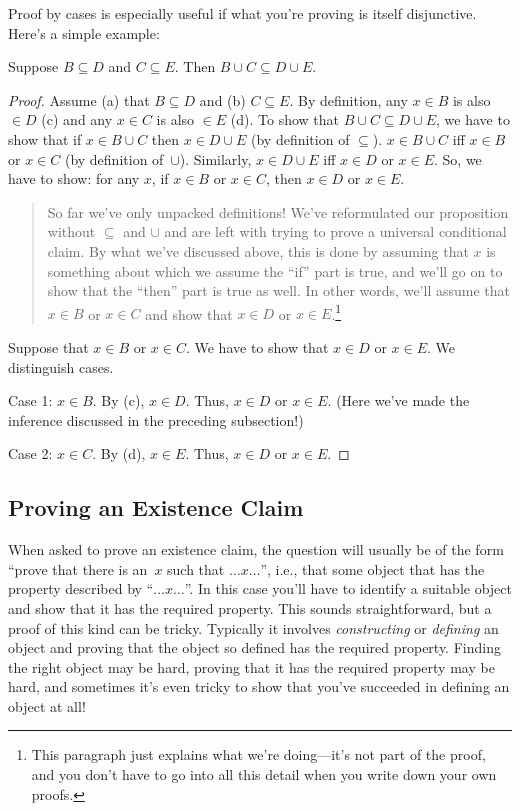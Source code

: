 \documentclass[../../../include/open-logic-section]{subfiles}
\begin{document}
Proof by cases is especially useful if what you're proving is itself
disjunctive. Here's a simple example:

\begin{prop}
Suppose $B \subseteq D$ and $C \subseteq E$. Then $B \cup C \subseteq
D \cup E$.
\end{prop}

\begin{proof}
  Assume (a) that $B \subseteq D$ and (b) $C \subseteq E$. By
  definition, any $x \in B$ is also $\in D$ (c) and any $x \in C$ is
  also $\in E$ (d).  To show that $B \cup C \subseteq D \cup E$, we
  have to show that if $x \in B \cup C$ then $x \in D \cup E$ (by
  definition of $\subseteq$). $x \in B \cup C$ iff $x \in B$ or $x \in
  C$ (by definition of~$\cup$). Similarly, $x \in D \cup E$ iff $x \in
  D$ or $x \in E$. So, we have to show: for any $x$, if $x \in B$ or
  $x \in C$, then $x \in D$ or $x \in E$.

  \begin{quote}
  So far we've only unpacked definitions!{} We've reformulated our
  proposition without $\subseteq$ and $\cup$ and are left with trying
  to prove a universal conditional claim. By what we've discussed
  above, this is done by assuming that $x$ is something about which we
  assume the ``if'' part is true, and we'll go on to show that the
  ``then'' part is true as well. In other words, we'll assume that $x
  \in B$ or $x \in C$ and show that $x \in D$ or $x \in
  E$.\footnote{This paragraph just explains what we're doing---it's
    not part of the proof, and you don't have to go into all this
    detail when you write down your own proofs.}
  \end{quote}

  Suppose that $x \in B$ or $x \in C$. We have to show that $x \in D$
  or $x \in E$. We distinguish cases.

  Case 1: $x \in B$. By (c), $x \in D$. Thus, $x \in D$ or $x \in
  E$. (Here we've made the inference discussed in the preceding
  subsection!)
      
  Case 2: $x \in C$. By (d), $x \in E$. Thus, $x \in D$ or $x \in E$.
 \end{proof}


\subsection{Proving an Existence Claim}

When asked to prove an existence claim, the question will usually be
of the form ``prove that there is an~$x$ such that $\dots x \dots$'',
i.e., that some object that has the property described by ``$\dots x
\dots$''. In this case you'll have to identify a suitable object and show
that it has the required property.  This sounds straightforward, but a
proof of this kind can be tricky. Typically it involves
\emph{constructing} or \emph{defining} an object and proving that the
object so defined has the required property. Finding the right object
may be hard, proving that it has the required property may be hard,
and sometimes it's even tricky to show that you've succeeded in
defining an object at all!{}
\end{document}
